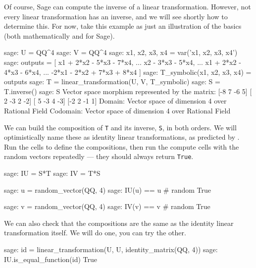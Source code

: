 Of course, Sage can compute the inverse of a linear transformation.  However, not every linear transformation has an inverse, and we will see shortly how to determine this.  For now, take this example as just an illustration of the basics (both mathematically and for Sage).
%
\begin{sageexample}
sage: U = QQ^4
sage: V = QQ^4
sage: x1, x2, x3, x4 = var('x1, x2, x3, x4')
sage: outputs = [   x1 + 2*x2 - 5*x3 - 7*x4,
...                        x2 - 3*x3 - 5*x4,
...                 x1 + 2*x2 - 4*x3 - 6*x4,
...              -2*x1 - 2*x2 + 7*x3 + 8*x4 ]
sage: T_symbolic(x1, x2, x3, x4) = outputs
sage: T = linear_transformation(U, V, T_symbolic)
sage: S = T.inverse()
sage: S
Vector space morphism represented by the matrix:
[-8  7 -6  5]
[ 2 -3  2 -2]
[ 5 -3  4 -3]
[-2  2 -1  1]
Domain: Vector space of dimension 4 over Rational Field
Codomain: Vector space of dimension 4 over Rational Field
\end{sageexample}
%
We can build the composition of \verb?T? and its inverse, \verb?S?, in both orders.  We will optimistically name these as identity linear transformations, as predicted by .  Run the cells to define the compositions, then run the compute cells with the random vectors repeatedly --- they should always return \verb?True?.
%
\begin{sageexample}
sage: IU = S*T
sage: IV = T*S
\end{sageexample}
%
\begin{sageexample}
sage: u = random_vector(QQ, 4)
sage: IU(u) == u      # random
True
\end{sageexample}
%
\begin{sageexample}
sage: v = random_vector(QQ, 4)
sage: IV(v) == v      # random
True
\end{sageexample}
%
We can also check that the compositions are the same as the identity linear transformation itself.  We will do one, you can try the other.
%
\begin{sageexample}
sage: id = linear_transformation(U, U, identity_matrix(QQ, 4))
sage: IU.is_equal_function(id)
True
\end{sageexample}
%
\begin{sageverbatim}
\end{sageverbatim}
%

